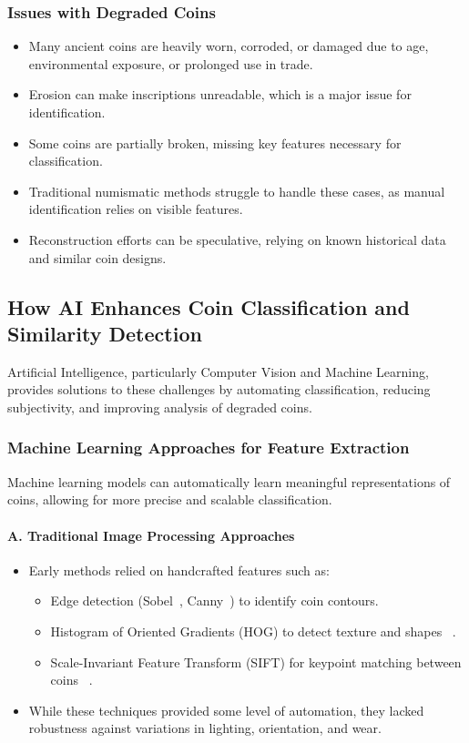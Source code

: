 \documentclass[nolibertine, english, algorithm, nomencl, minted]{ttlab-qualify}
\begin{document}
\subsubsection{Issues with Degraded Coins}
\begin{itemize}
    \item Many ancient coins are heavily worn, corroded, or damaged due to age, environmental exposure, or prolonged use in trade.
    \item Erosion can make inscriptions unreadable, which is a major issue for identification.
    \item Some coins are partially broken, missing key features necessary for classification.
    \item Traditional numismatic methods struggle to handle these cases, as manual identification relies on visible features.
    \item Reconstruction efforts can be speculative, relying on known historical data and similar coin designs.
\end{itemize}


\subsection{How AI Enhances Coin Classification and Similarity Detection}
Artificial Intelligence, particularly Computer Vision and Machine Learning, provides solutions to these challenges by 
automating classification, reducing subjectivity, and improving analysis of degraded coins.

\subsubsection{Machine Learning Approaches for Feature Extraction}
Machine learning models can automatically learn meaningful representations of coins, 
allowing for more precise and scalable classification.
\paragraph{A. Traditional Image Processing Approaches}

\begin{itemize}
    \item Early methods relied on handcrafted features such as:
    \begin{itemize}
        \item Edge detection (Sobel~\cite{gonzalez2002digital}, Canny~\cite{canny1986edge}) to identify coin contours.
        \item Histogram of Oriented Gradients (HOG) to detect texture and shapes ~\parencite{dalal2005hog}.
        \item Scale-Invariant Feature Transform (SIFT) for keypoint matching between coins ~\parencite{lowe2004sift}.
    \end{itemize}

    \item While these techniques provided some level of automation, they lacked robustness against variations in lighting, 
    orientation, and wear.
\end{itemize}
\end{document}
